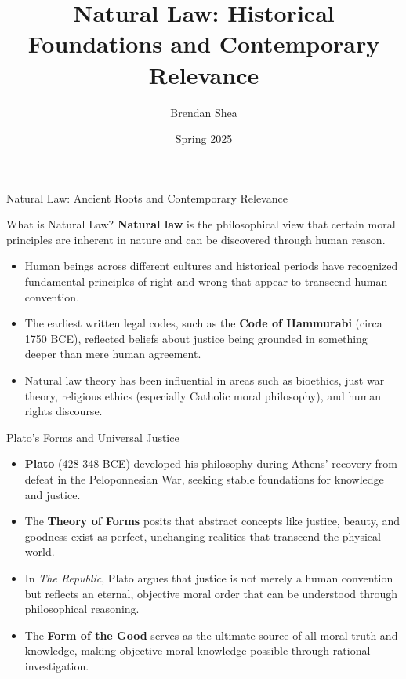 \documentclass{beamer}
\title{Natural Law: Historical Foundations and Contemporary Relevance}
\author{Brendan Shea}
\date{Spring 2025}
\begin{document}
\begin{frame}
    \titlepage
\end{frame}

\begin{frame}{Natural Law: Ancient Roots and Contemporary Relevance}
    \begin{alertblock}{What is Natural Law?}
        \textbf{Natural law} is the philosophical view that certain moral principles are inherent in nature and can be discovered through human reason.
    \end{alertblock}
    
    \begin{itemize}
        \item Human beings across different cultures and historical periods have recognized fundamental principles of right and wrong that appear to transcend human convention.
        
        \item The earliest written legal codes, such as the \textbf{Code of Hammurabi} (circa 1750 BCE), reflected beliefs about justice being grounded in something deeper than mere human agreement.

        \item Natural law theory has been influential in areas such as bioethics, just war theory, religious ethics (especially Catholic moral philosophy), and human rights discourse.
        
    \end{itemize}
\end{frame}


\begin{frame}{Plato's Forms and Universal Justice}
    \begin{itemize}
        \item \textbf{Plato} (428-348 BCE) developed his philosophy during Athens' recovery from defeat in the Peloponnesian War, seeking stable foundations for knowledge and justice.
        
        \item The \textbf{Theory of Forms} posits that abstract concepts like justice, beauty, and goodness exist as perfect, unchanging realities that transcend the physical world.
        
        \item In \textit{The Republic}, Plato argues that justice is not merely a human convention but reflects an eternal, objective moral order that can be understood through philosophical reasoning.
        
        \item The \textbf{Form of the Good} serves as the ultimate source of all moral truth and knowledge, making objective moral knowledge possible through rational investigation.
    \end{itemize}
\end{frame}
\end{document}

